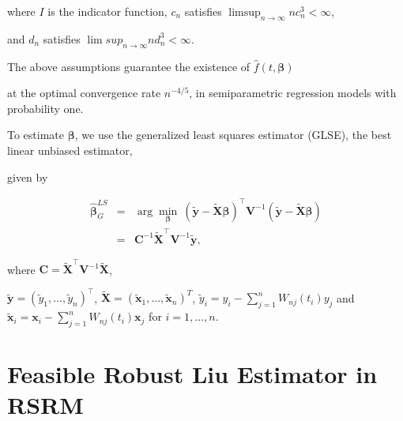 \documentclass[10pt,twoside]{article}
\numberwithin{equation}{section}
\begin{document}
\noindent where $I$ is the indicator function, $c_n$ satisfies $\limsup_{n\rightarrow\infty}nc_n^3 < \infty$,

and $d_n$ satisfies $\lim sup_{n\rightarrow\infty}nd_n^3 < \infty$.



The above assumptions guarantee the existence of $\hat f(t,\boldsymbol\beta)$

at the optimal convergence rate $n^{-4/5}$, in semiparametric regression models with probability one.



To estimate $\boldsymbol\beta$, we use the generalized least squares estimator (GLSE), the best linear unbiased estimator,

given by

\begin{eqnarray}\label{eq23}

\hat{\boldsymbol\beta}_G^{LS}&=&\arg\min_{\boldsymbol\beta} ~(\widetilde{\boldsymbol y}-\widetilde{\boldsymbol X}\boldsymbol\beta)^\top\boldsymbol V^{-1}(\widetilde{\boldsymbol y}-\widetilde{\boldsymbol X}\boldsymbol\beta)  \nonumber\\

&=&\boldsymbol C^{-1}\widetilde{\boldsymbol X}^\top\boldsymbol V^{-1}\widetilde{\boldsymbol y},

\end{eqnarray}

where $\boldsymbol C=\widetilde{\boldsymbol X}^\top\boldsymbol V^{-1}\widetilde{\boldsymbol X}$,

$\widetilde{\boldsymbol y}=(\widetilde{y}_1,\ldots,\widetilde{y}_n)^\top$, $\widetilde{\boldsymbol X}

=(\widetilde{\boldsymbol x}_1,...,\widetilde{\boldsymbol x}_n)^T$, $\widetilde{y}_i=y_i-\sum_{j=1}^n

W_{nj}(t_i)y_j$ and $\widetilde{\boldsymbol x}_i=\boldsymbol{x}_i-\sum_{j=1}^n

W_{nj}(t_i)\boldsymbol{x}_j$ for $i= 1,\ldots,n$.



\section{Feasible Robust Liu Estimator in RSRM}
\end{document}
